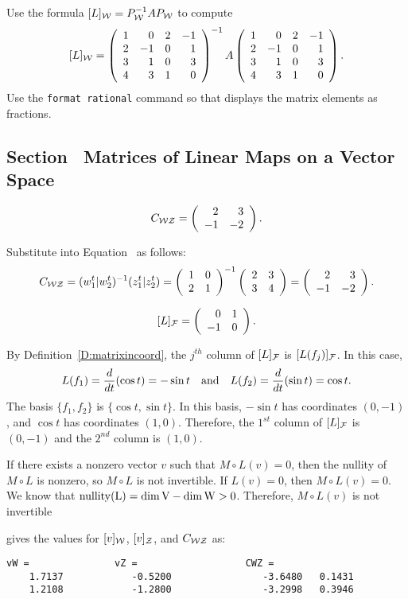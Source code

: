 \documentclass{ximera}
\begin{document}
\para Use the formula $[L]_{\cal W} = P_{\cal W}^{-1}AP_{\cal W}$ to compute
\[
[L]_{\cal W} = \left(\begin{array}{rrrr} 1 & 0 & 2 & -1 \\ 2 & -1 & 0
& 1 \\ 3 & 1 & 0 & 3 \\ 4 & 3 & 1 & 0 \end{array}\right)^{-1} A
\left(\begin{array}{rrrr} 1 & 0 & 2 & -1 \\ 2 & -1
& 0 & 1 \\ 3 & 1 & 0 & 3 \\ 4 & 3 & 1 & 0 \end{array}\right).
\]
Use the {\tt format rational} command so that \Matlab displays
the matrix elements as fractions.


\subsection*{Section~\protect{\ref{MALT}} Matrices of Linear Maps on a
Vector Space}

\ans
\[ C_{\cal WZ} = \left(\begin{array}{rr} 2 & 3\\ -1 &-2\end{array}\right). \]

\soln Substitute into Equation~ as follows:
\[ C_{\cal WZ} = (w_1^t|w_2^t)^{-1}(z_1^t|z_2^t) =
\left(\begin{array}{rr} 1 & 0\\ 2 &1\end{array}\right)^{-1}\left(\begin{array}{rr} 2 & 3\\ 3 &4\end{array}\right) =
\left(\begin{array}{rr} 2 & 3\\ -1 &-2\end{array}\right). \]

\ans \[ [L]_{\cal F} = \left(\begin{array}{rr} 0 & 1\\ -1 &0\end{array}\right). \]

\soln By Definition~\ref{D:matrixincoord}, the $j^{th}$
column of $[L]_{\cal F}$ is $[L(f_j)]_{\cal F}$.  In this case,
\[
L(f_1) = \frac{d}{dt}(\cos t) = -\sin t \quad\mbox{and}\quad
L(f_2) = \frac{d}{dt}(\sin t) = \cos t.
\]
The basis $\{f_1,f_2\}$ is $\{\cos t,\sin t\}$.  In this basis,
$-\sin t$ has coordinates $(0,-1)$, and $\cos t$ has coordinates
$(1,0)$.  Therefore, the $1^{st}$ column of $[L]_{\cal F}$ is
$(0,-1)$ and the $2^{nd}$ column is $(1,0)$.

If there exists a nonzero vector $v$ such that $M\circ L(v) = 0$,
then the nullity of $M \circ L$ is nonzero, so $M \circ L$ is not
invertible.  If $L(v) = 0$, then $M \circ L(v) = 0$.  We know that
$\rm{nullity}(L) = \dim V - \dim W > 0$.  Therefore, $M\circ L(v)$
is not invertible

\ans \Matlab gives the values for $[v]_{\cal W}$, $[v]_{\cal Z}$, and
$C_{\cal WZ}$ as:
\begin{verbatim}
vW =               vZ =                   CWZ =
    1.7137            -0.5200                -3.6480   0.1431
    1.2108            -1.2800                -3.2998   0.3946
\end{verbatim}
\end{document}
